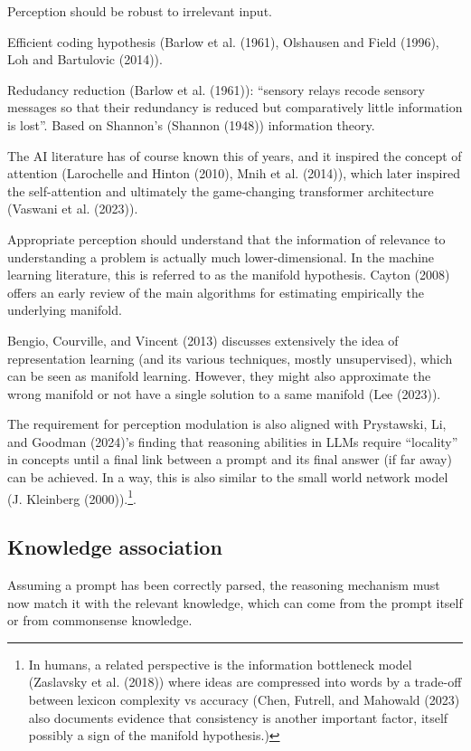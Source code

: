 \documentclass[
]{article}
\begin{document}
Perception should be robust to irrelevant input.

Efficient coding hypothesis (Barlow et al. (1961), Olshausen and Field
(1996), Loh and Bartulovic (2014)).

Redudancy reduction (Barlow et al. (1961)): ``sensory relays recode
sensory messages so that their redundancy is reduced but comparatively
little information is lost''. Based on Shannon's (Shannon (1948))
information theory.

The AI literature has of course known this of years, and it inspired the
concept of attention (Larochelle and Hinton (2010), Mnih et al. (2014)),
which later inspired the self-attention and ultimately the game-changing
transformer architecture (Vaswani et al. (2023)).

Appropriate perception should understand that the information of
relevance to understanding a problem is actually much lower-dimensional.
In the machine learning literature, this is referred to as the manifold
hypothesis. Cayton (2008) offers an early review of the main algorithms
for estimating empirically the underlying manifold.

Bengio, Courville, and Vincent (2013) discusses extensively the idea of
representation learning (and its various techniques, mostly
unsupervised), which can be seen as manifold learning. However, they
might also approximate the wrong manifold or not have a single solution
to a same manifold (Lee (2023)).

The requirement for perception modulation is also aligned with
Prystawski, Li, and Goodman (2024)'s finding that reasoning abilities in
LLMs require ``locality'' in concepts until a final link between a
prompt and its final answer (if far away) can be achieved. In a way,
this is also similar to the small world network model (J. Kleinberg
(2000)).\footnote{In humans, a related perspective is the information
  bottleneck model (Zaslavsky et al. (2018)) where ideas are compressed
  into words by a trade-off between lexicon complexity vs accuracy
  (Chen, Futrell, and Mahowald (2023) also documents evidence that
  consistency is another important factor, itself possibly a sign of the
  manifold hypothesis.)}.

\subsection{Knowledge association}\label{knowledge-association}

Assuming a prompt has been correctly parsed, the reasoning mechanism
must now match it with the relevant knowledge, which can come from the
prompt itself or from commonsense knowledge.
\end{document}
